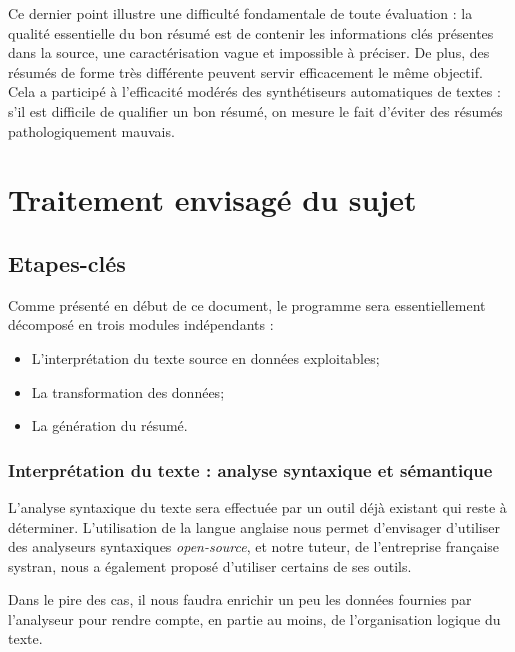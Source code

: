 \documentclass{article}           %
\begin{document}
  Ce dernier point illustre une difficulté fondamentale de toute évaluation : la qualité essentielle du bon résumé est de contenir les informations clés présentes dans la source, une caractérisation vague et impossible à préciser. De plus, des résumés de forme très différente peuvent servir efficacement le même objectif. Cela a participé à l'efficacité modérés des synthétiseurs automatiques de textes : s'il est difficile de qualifier un bon résumé, on mesure le fait d'éviter des résumés pathologiquement mauvais.

\section{Traitement envisagé du sujet}

\subsection{Etapes-clés} %

Comme présenté en début de ce document, le programme sera essentiellement décomposé en trois modules indépendants :
\begin{itemize}
 \item L'interprétation du texte source en données exploitables;
 \item La transformation des données;
 \item La génération du résumé.
\end{itemize}


\subsubsection{Interprétation du texte : analyse syntaxique et sémantique}

L'analyse syntaxique du texte sera effectuée par un outil déjà existant qui reste à déterminer. L'utilisation de la langue anglaise nous permet d'envisager d'utiliser des analyseurs syntaxiques \emph{open-source}, et notre tuteur, de l'entreprise française systran, nous a également proposé d'utiliser certains de ses outils.

Dans le pire des cas, il nous faudra enrichir un peu les données fournies par l'analyseur pour rendre compte, en partie au moins, de l'organisation logique du texte.

\end{document}
